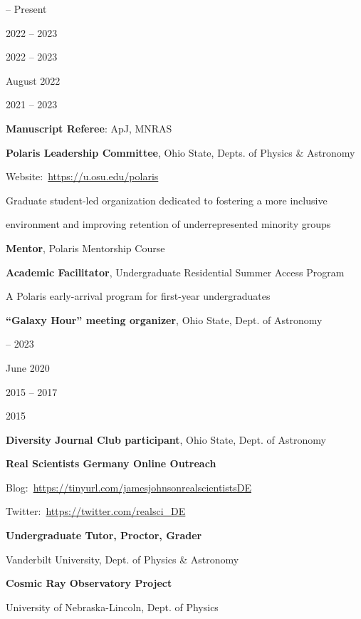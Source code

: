 \documentclass[cv.tex]{subfiles}
\begin{document}
\parbox{0.18\textwidth}{%
	 -- Present \par
	2022 -- 2023 \par
	\null \par
	\null \par
	\null \par
	2022 -- 2023 \par
	August 2022 \par
	\null \par
	2021 -- 2023 \par
}
\hspace{1mm}
\parbox{0.8\textwidth}{%
	\vspace{1mm}
	\textbf{Manuscript Referee}: ApJ, MNRAS \par
	\textbf{Polaris Leadership Committee}, Ohio State, Depts. of Physics \&
	Astronomy \par
	Website:~\url{https://u.osu.edu/polaris} \par
	Graduate student-led organization dedicated to fostering a more inclusive
	\par
	environment and improving retention of underrepresented minority groups \par
	\textbf{Mentor}, Polaris Mentorship Course \par
	\textbf{Academic Facilitator}, Undergraduate Residential Summer Access
	Program \par
	A Polaris early-arrival program for first-year undergraduates \par
	\textbf{``Galaxy Hour'' meeting organizer}, Ohio State, Dept. of Astronomy
	\par
}

\noindent
\parbox{0.18\textwidth}{%
	 -- 2023 \par
	June 2020 \par
	\null \par
	\null \par
	2015 -- 2017 \par
	\null \par
	2015 \par
	\null \par
}
\hspace{1mm}
\parbox{0.8\textwidth}{%
	\vspace{1mm}
	\textbf{Diversity Journal Club participant}, Ohio State,
	Dept. of Astronomy \par
	\textbf{Real Scientists Germany Online Outreach} \par
	Blog:~\url{https://tinyurl.com/jamesjohnsonrealscientistsDE} \par
	Twitter:~\url{https://twitter.com/realsci_DE} \par
	\textbf{Undergraduate Tutor, Proctor, Grader} \par
	Vanderbilt University, Dept. of Physics \& Astronomy \par
	\textbf{Cosmic Ray Observatory Project} \par
	University of Nebraska-Lincoln, Dept. of Physics \par
}
\end{document}
